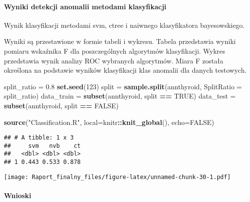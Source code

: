 \documentclass[
]{article}
\newenvironment{Shaded}{\begin{snugshade}}{\end{snugshade}}
\newcommand{\DataTypeTok}[1]{\textcolor[rgb]{0.13,0.29,0.53}{#1}}
\newcommand{\DecValTok}[1]{\textcolor[rgb]{0.00,0.00,0.81}{#1}}
\newcommand{\FloatTok}[1]{\textcolor[rgb]{0.00,0.00,0.81}{#1}}
\newcommand{\KeywordTok}[1]{\textcolor[rgb]{0.13,0.29,0.53}{\textbf{#1}}}
\newcommand{\NormalTok}[1]{#1}
\newcommand{\OperatorTok}[1]{\textcolor[rgb]{0.81,0.36,0.00}{\textbf{#1}}}
\newcommand{\OtherTok}[1]{\textcolor[rgb]{0.56,0.35,0.01}{#1}}
\newcommand{\StringTok}[1]{\textcolor[rgb]{0.31,0.60,0.02}{#1}}
\begin{document}
\hypertarget{wyniki-detekcji-anomalii-metodami-klasyfikacji}{%
\paragraph{Wyniki detekcji anomalii metodami
klasyfikacji}\label{wyniki-detekcji-anomalii-metodami-klasyfikacji}}

Wynik klasyfikacji metodami svm, ctree i naiwnego klasyfikatora
bayesowskiego.

Wyniki są przestawione w formie tabeli i wykresu. Tabela przedstawia
wyniki pomiaru wskaźnika F dla poszczególnych algorytmów klasyfikacji.
Wykres przedstawia wynik analizy ROC wybranych algorytmów. Miara F
została określona na podstawie wyników klasyfikacji klas anomalii dla
danych testowych.

\begin{Shaded}
\begin{Highlighting}[]
\NormalTok{split_ratio =}\StringTok{ }\FloatTok{0.8}
\KeywordTok{set.seed}\NormalTok{(}\DecValTok{123}\NormalTok{)}
\NormalTok{split =}\StringTok{ }\KeywordTok{sample.split}\NormalTok{(annthyroid, }\DataTypeTok{SplitRatio =}\NormalTok{ split_ratio)}
\NormalTok{data_train =}\StringTok{ }\KeywordTok{subset}\NormalTok{(annthyroid, split }\OperatorTok{==}\StringTok{ }\OtherTok{TRUE}\NormalTok{)}
\NormalTok{data_test =}\StringTok{ }\KeywordTok{subset}\NormalTok{(annthyroid, split }\OperatorTok{==}\StringTok{ }\OtherTok{FALSE}\NormalTok{)}

\KeywordTok{source}\NormalTok{(}\StringTok{"Classification.R"}\NormalTok{, }\DataTypeTok{local=}\NormalTok{knitr}\OperatorTok{::}\KeywordTok{knit_global}\NormalTok{(), }\DataTypeTok{echo=}\OtherTok{FALSE}\NormalTok{)}
\end{Highlighting}
\end{Shaded}

\begin{verbatim}
## # A tibble: 1 x 3
##     svm   nvb    ct
##   <dbl> <dbl> <dbl>
## 1 0.443 0.533 0.878
\end{verbatim}

\texttt{[image: Raport\_finalny\_files/figure-latex/unnamed-chunk-30-1.pdf]}

\hypertarget{wnioski}{%
\paragraph{Wnioski}\label{wnioski}}
\end{document}
